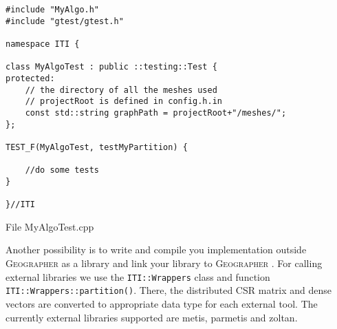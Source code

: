 \documentclass[a4paper,10pt]{article}
\newcommand{\geo}{\textsc{Geographer} }
\newcommand{\red}[1]{{\color{red}{#1}}}
\newcommand{\MI}[1]{\texttt{#1}}
\begin{document}
\begin{algorithm}
\begin{verbatim}
#include "MyAlgo.h"
#include "gtest/gtest.h"

namespace ITI {

class MyAlgoTest : public ::testing::Test {
protected:
    // the directory of all the meshes used
    // projectRoot is defined in config.h.in
    const std::string graphPath = projectRoot+"/meshes/";
};

TEST_F(MyAlgoTest, testMyPartition) {
	
    //do some tests
}

}//ITI
\end{verbatim}
\caption{File MyAlgoTest.cpp}
\label{MyAlgoTest.cpp}
\end{algorithm}


\red{TODO: expand: create MyAlgo as a library and use Wrappers}

Another possibility is to write and compile you implementation outside \geo as a library and link
your library to \geo. For calling external libraries we use the \MI{ITI::Wrappers} class and function
\MI{ITI::Wrappers::partition()}. There, the distributed CSR matrix and dense vectors are converted
to appropriate data type for each external tool. The currently external libraries supported are
metis, parmetis and zoltan.
\end{document}
